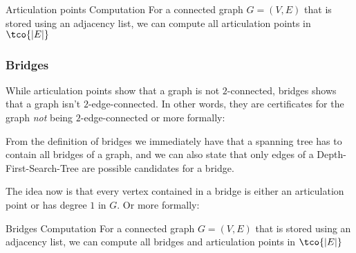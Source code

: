 \begin{theorem}[]{Articulation points Computation}
    For a connected graph $G = (V, E)$ that is stored using an adjacency list, we can compute all articulation points in $\tco{|E|}$
\end{theorem}


\newpage
\subsubsection{Bridges}
While articulation points show that a graph is not $2$-connected, bridges shows that a graph isn't $2$-edge-connected.
In other words, they are certificates for the graph \textit{not} being $2$-edge-connected or more formally:

\begin{center}
\end{center}

From the definition of bridges we immediately have that a spanning tree has to contain all bridges of a graph, and we can also state that only edges of a Depth-First-Search-Tree are possible candidates for a bridge.

The idea now is that every vertex contained in a bridge is either an articulation point or has degree $1$ in $G$. Or more formally:

\begin{center}
\end{center}

\begin{theorem}[]{Bridges Computation}
    For a connected graph $G = (V, E)$ that is stored using an adjacency list, we can compute all bridges and articulation points in $\tco{|E|}$
\end{theorem}

